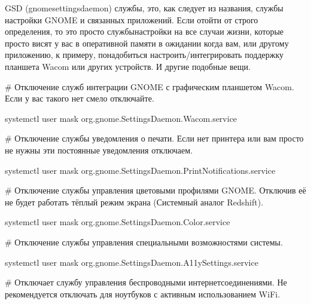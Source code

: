 \documentclass[letterpaper,10pt,russian,openany]{sphinxmanual}
\begin{document}
\sphinxAtStartPar
GSD (gnome\sphinxhyphen{}settings\sphinxhyphen{}daemon) службы, это, как следует из названия, службы настройки GNOME и связанных приложений.
Если отойти от строго определения, то это просто службы\sphinxhyphen{}настройки на все случаи жизни,
которые просто висят у вас в оперативной памяти в ожидании когда вам, или другому приложению, к примеру,
понадобиться настроить/интегрировать поддержку планшета Wacom или других устройств. И другие подобные вещи.

\sphinxAtStartPar
\# Отключение служб интеграции GNOME с графическим планшетом Wacom.
Если у вас такого нет \sphinxhyphen{} смело отключайте.

\begin{sphinxVerbatim}[commandchars=\\\{\}]
systemctl \PYGZhy{}\PYGZhy{}user mask org.gnome.SettingsDaemon.Wacom.service
\end{sphinxVerbatim}

\sphinxAtStartPar
\# Отключение службы уведомления о печати.
Если нет принтера или вам просто не нужны эти постоянные уведомления \sphinxhyphen{} отключаем.

\begin{sphinxVerbatim}[commandchars=\\\{\}]
systemctl \PYGZhy{}\PYGZhy{}user mask org.gnome.SettingsDaemon.PrintNotifications.service
\end{sphinxVerbatim}

\sphinxAtStartPar
\# Отключение службы управления цветовыми профилями GNOME.
Отключив её не будет работать тёплый режим экрана (Системный аналог Redshift).

\begin{sphinxVerbatim}[commandchars=\\\{\}]
systemctl \PYGZhy{}\PYGZhy{}user mask org.gnome.SettingsDaemon.Color.service
\end{sphinxVerbatim}

\sphinxAtStartPar
\# Отключение службы управления специальными возможностями системы.

\begin{sphinxVerbatim}[commandchars=\\\{\}]
systemctl \PYGZhy{}\PYGZhy{}user mask org.gnome.SettingsDaemon.A11ySettings.service
\end{sphinxVerbatim}

\sphinxAtStartPar
\# Отключает службу управления беспроводными интернет\sphinxhyphen{}соединениями.
Не рекомендуется отключать для ноутбуков с активным использованием Wi\sphinxhyphen{}Fi.
\end{document}
